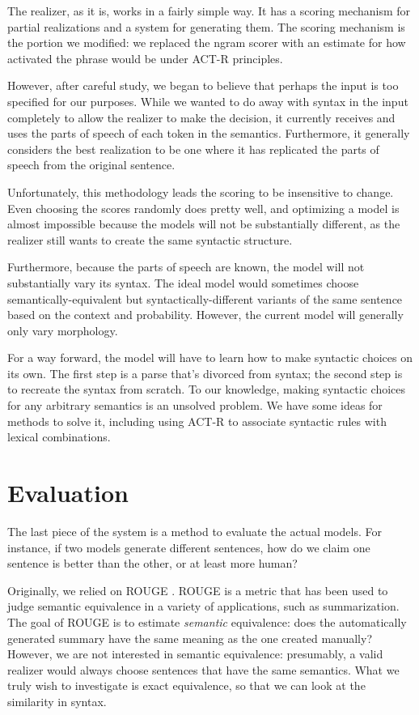\documentclass[11pt]{article}
\begin{document}
The realizer, as it is, works in a fairly simple way. It has a scoring mechanism for partial realizations and a system for generating them. The scoring mechanism is the portion we modified: we replaced the ngram scorer with an estimate for how activated the phrase would be under ACT-R principles.

However, after careful study, we began to believe that perhaps the input is too specified for our purposes. While we wanted to do away with syntax in the input completely to allow the realizer to make the decision, it currently receives and uses the parts of speech of each token in the semantics. Furthermore, it generally considers the best realization to be one where it has replicated the parts of speech from the original sentence.

Unfortunately, this methodology leads the scoring to be insensitive to change. Even choosing the scores randomly does pretty well, and optimizing a model is almost impossible because the models will not be substantially different, as the realizer still wants to create the same syntactic structure.

Furthermore, because the parts of speech are known, the model will not substantially vary its syntax. The ideal model would sometimes choose semantically-equivalent but syntactically-different variants of the same sentence based on the context and probability. However, the current model will generally only vary morphology.

For a way forward, the model will have to learn how to make syntactic choices on its own. The first step is a parse that's divorced from syntax; the second step is to recreate the syntax from scratch. To our knowledge, making syntactic choices for any arbitrary semantics is an unsolved problem. We have some ideas for methods to solve it, including using ACT-R to associate syntactic rules with lexical combinations.    

\section{Evaluation}
The last piece of the system is a method to evaluate the actual models. For instance, if two models generate different sentences, how do we claim one sentence is better than the other, or at least more human? 

Originally, we relied on ROUGE \cite{rouge}. ROUGE is a metric that has been used to judge semantic equivalence in a variety of applications, such as summarization. The goal of ROUGE is to estimate \textit{semantic} equivalence: does the automatically generated summary have the same meaning as the one created manually? However, we are not interested in semantic equivalence: presumably, a valid realizer would always choose sentences that have the same semantics. What we truly wish to investigate is exact equivalence, so that we can look at the similarity in syntax.
\end{document}
